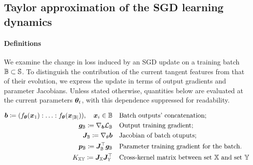 \documentclass[10pt]{article} %
\newcommand{\batchloss}{\mathcal{L}_{\sB}}
\begin{document}
\subsection{Taylor approximation of the SGD learning dynamics}


\paragraph{Definitions}
We examine the change in loss induced by an SGD update on a training batch ${\mathbb{B}} \subset {\mathbb{S}}$. To distinguish the contribution of the current tangent features from that of their evolution, we express the update in terms of output gradients and parameter Jacobians. Unless stated otherwise, quantities below are evaluated at the current parameters ${\bm{\theta}}_t$, with this dependence suppressed for readability.

\begin{align*}
    \vb \coloneqq (f_\vtheta(\vx_1): \ldots : f_\vtheta(\vx_{|\sB|})), \quad \vx_i \in \sB  \quad & \text{Batch outputs' concatenation;} \\
    \vg_\sB \coloneqq \nabla_\vb \batchloss \quad & \text{Output training gradient;}\\
    \mJ_{\sB} \coloneqq \nabla_\theta \vb \quad &  \text{Jacobian of batch otuputs;}\\
    \vp_\sB \coloneqq  \mJ^\top_{\sB} \vg_\sB  \quad & \text{Parameter training gradient for the batch.}\\
    K_{\sX \sY} \coloneqq  \mJ_{\sX} \mJ^\top_{\sY}  \quad & \text{Cross-kernel matrix between set $\sX$ and set $\sY$}
\end{align*}
\end{document}
